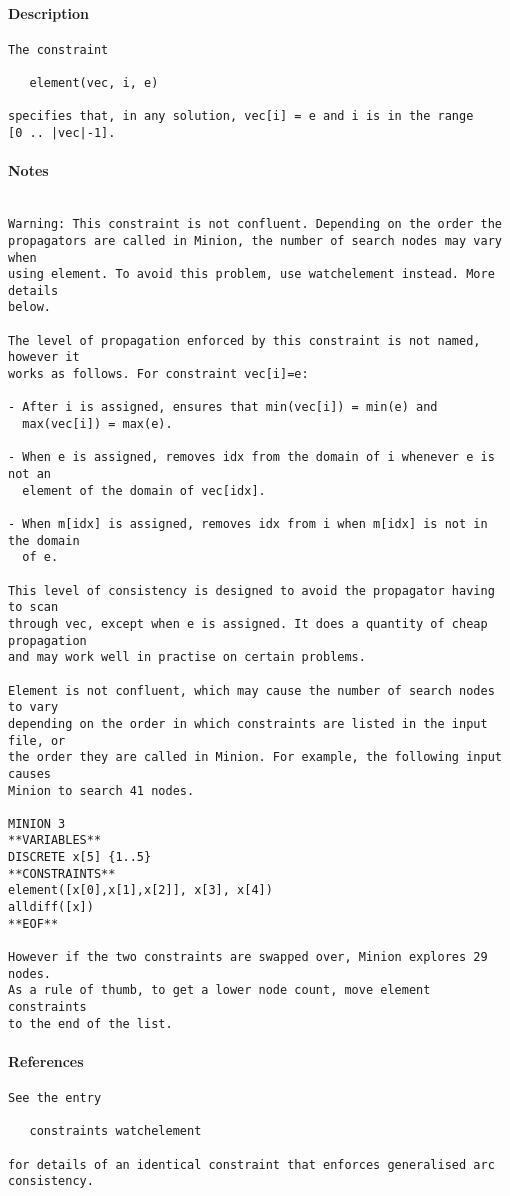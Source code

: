 \paragraph{Description}
{\footnotesize
\begin{verbatim}
The constraint 

   element(vec, i, e)

specifies that, in any solution, vec[i] = e and i is in the range 
[0 .. |vec|-1].
\end{verbatim}
}
\paragraph{Notes}
{\footnotesize
\begin{verbatim}

Warning: This constraint is not confluent. Depending on the order the
propagators are called in Minion, the number of search nodes may vary when
using element. To avoid this problem, use watchelement instead. More details
below.

The level of propagation enforced by this constraint is not named, however it
works as follows. For constraint vec[i]=e:

- After i is assigned, ensures that min(vec[i]) = min(e) and 
  max(vec[i]) = max(e).

- When e is assigned, removes idx from the domain of i whenever e is not an
  element of the domain of vec[idx].

- When m[idx] is assigned, removes idx from i when m[idx] is not in the domain
  of e.

This level of consistency is designed to avoid the propagator having to scan
through vec, except when e is assigned. It does a quantity of cheap propagation
and may work well in practise on certain problems.

Element is not confluent, which may cause the number of search nodes to vary
depending on the order in which constraints are listed in the input file, or 
the order they are called in Minion. For example, the following input causes
Minion to search 41 nodes.

MINION 3
**VARIABLES**
DISCRETE x[5] {1..5}
**CONSTRAINTS**
element([x[0],x[1],x[2]], x[3], x[4])
alldiff([x])
**EOF**

However if the two constraints are swapped over, Minion explores 29 nodes.
As a rule of thumb, to get a lower node count, move element constraints
to the end of the list.
\end{verbatim}
}
\paragraph{References}
{\footnotesize
\begin{verbatim}
See the entry 

   constraints watchelement

for details of an identical constraint that enforces generalised arc
consistency.
\end{verbatim}
}
